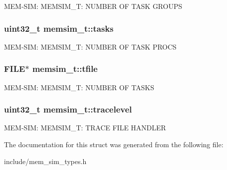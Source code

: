 M\-E\-M-\/\-S\-I\-M\-: M\-E\-M\-S\-I\-M\-\_\-\-T\-: N\-U\-M\-B\-E\-R O\-F T\-A\-S\-K G\-R\-O\-U\-P\-S \hypertarget{structmemsim__t_a907d500eb21a9b3c8813ed0e639d806c}{
\subsubsection[{tasks}]{\setlength{\rightskip}{0pt plus 5cm}uint32\-\_\-t memsim\-\_\-t\-::tasks}}\label{structmemsim__t_a907d500eb21a9b3c8813ed0e639d806c}
M\-E\-M-\/\-S\-I\-M\-: M\-E\-M\-S\-I\-M\-\_\-\-T\-: N\-U\-M\-B\-E\-R O\-F T\-A\-S\-K P\-R\-O\-C\-S \hypertarget{structmemsim__t_a0bdb5e96cb3acca8a4ec5daea271243d}{
\subsubsection[{tfile}]{\setlength{\rightskip}{0pt plus 5cm}F\-I\-L\-E$\ast$ memsim\-\_\-t\-::tfile}}\label{structmemsim__t_a0bdb5e96cb3acca8a4ec5daea271243d}
M\-E\-M-\/\-S\-I\-M\-: M\-E\-M\-S\-I\-M\-\_\-\-T\-: N\-U\-M\-B\-E\-R O\-F T\-A\-S\-K\-S \hypertarget{structmemsim__t_a5adec994c4699e314a35284102cb1cb3}{
\subsubsection[{tracelevel}]{\setlength{\rightskip}{0pt plus 5cm}uint32\-\_\-t memsim\-\_\-t\-::tracelevel}}\label{structmemsim__t_a5adec994c4699e314a35284102cb1cb3}
M\-E\-M-\/\-S\-I\-M\-: M\-E\-M\-S\-I\-M\-\_\-\-T\-: T\-R\-A\-C\-E F\-I\-L\-E H\-A\-N\-D\-L\-E\-R 

The documentation for this struct was generated from the following file\-:\begin{DoxyCompactItemize}
\item 
include/mem\-\_\-sim\-\_\-types.\-h\end{DoxyCompactItemize}
